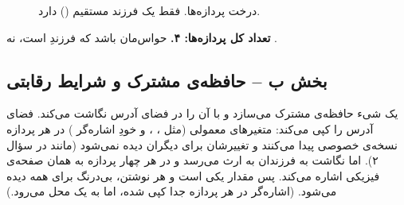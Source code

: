 \begin{figure}[ht]\centering
\begin{LTR}
\end{LTR}
\caption{درخت پردازه‌ها.  فقط یک فرزند مستقیم () دارد.}
\end{figure}

\textbf{تعداد کل پردازه‌ها: ۴.} حواس‌مان باشد که  فرزندِ  است، نه .

\subsection*{بخش ب – حافظه‌ی مشترک و شرایط رقابتی}

 یک شیء حافظه‌ی مشترک می‌سازد و  با  آن را در فضای آدرس  نگاشت می‌کند.  فضای آدرس را کپی می‌کند: متغیرهای معمولی (مثل ، ، و خودِ اشاره‌گر ) در هر پردازه نسخه‌ی خصوصی پیدا می‌کنند و تغییرشان برای دیگران دیده نمی‌شود (مانند  در سؤال ۲). اما نگاشت  به فرزندان به ارث می‌رسد و در هر چهار پردازه به همان صفحه‌ی فیزیکی اشاره می‌کند. پس مقدار  یکی است و هر نوشتن، بی‌درنگ برای همه دیده می‌شود. (اشاره‌گر  در هر پردازه جدا کپی شده، اما به یک محل می‌رود.)

